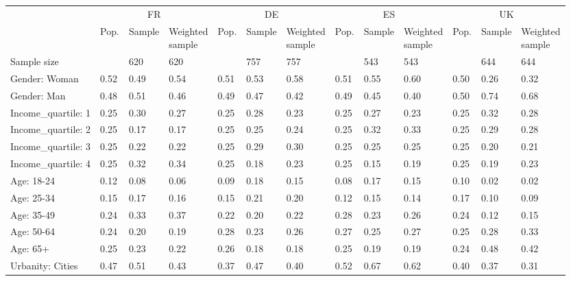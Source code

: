 
\begin{tabular}[t]{lllllllllllll}
\toprule
\multicolumn{1}{c}{} & \multicolumn{3}{c}{FR} & \multicolumn{3}{c}{DE} & \multicolumn{3}{c}{ES} & \multicolumn{3}{c}{UK} \\
\cmidrule(l{3pt}r{3pt}){2-4} \cmidrule(l{3pt}r{3pt}){5-7} \cmidrule(l{3pt}r{3pt}){8-10} \cmidrule(l{3pt}r{3pt}){11-13}
  & Pop. & Sample & \makecell{Weighted\\sample} & Pop. & Sample & \makecell{Weighted\\sample} & Pop. & Sample & \makecell{Weighted\\sample} & Pop. & Sample & \makecell{Weighted\\sample}\\
\midrule
Sample size &  & 620 & 620 &  & 757 & 757 &  & 543 & 543 &  & 644 & 644\\
\addlinespace
Gender: Woman & 0.52 & 0.49 & 0.54 & 0.51 & 0.53 & 0.58 & 0.51 & 0.55 & 0.60 & 0.50 & 0.26 & 0.32\\
Gender: Man & 0.48 & 0.51 & 0.46 & 0.49 & 0.47 & 0.42 & 0.49 & 0.45 & 0.40 & 0.50 & 0.74 & 0.68\\
\addlinespace
Income\_quartile: 1 & 0.25 & 0.30 & 0.27 & 0.25 & 0.28 & 0.23 & 0.25 & 0.27 & 0.23 & 0.25 & 0.32 & 0.28\\
Income\_quartile: 2 & 0.25 & 0.17 & 0.17 & 0.25 & 0.25 & 0.24 & 0.25 & 0.32 & 0.33 & 0.25 & 0.29 & 0.28\\
Income\_quartile: 3 & 0.25 & 0.22 & 0.22 & 0.25 & 0.29 & 0.30 & 0.25 & 0.25 & 0.25 & 0.25 & 0.20 & 0.21\\
Income\_quartile: 4 & 0.25 & 0.32 & 0.34 & 0.25 & 0.18 & 0.23 & 0.25 & 0.15 & 0.19 & 0.25 & 0.19 & 0.23\\
\addlinespace
Age: 18-24 & 0.12 & 0.08 & 0.06 & 0.09 & 0.18 & 0.15 & 0.08 & 0.17 & 0.15 & 0.10 & 0.02 & 0.02\\
Age: 25-34 & 0.15 & 0.17 & 0.16 & 0.15 & 0.21 & 0.20 & 0.12 & 0.15 & 0.14 & 0.17 & 0.10 & 0.09\\
Age: 35-49 & 0.24 & 0.33 & 0.37 & 0.22 & 0.20 & 0.22 & 0.28 & 0.23 & 0.26 & 0.24 & 0.12 & 0.15\\
Age: 50-64 & 0.24 & 0.20 & 0.19 & 0.28 & 0.23 & 0.26 & 0.27 & 0.25 & 0.27 & 0.25 & 0.28 & 0.33\\
Age: 65+ & 0.25 & 0.23 & 0.22 & 0.26 & 0.18 & 0.18 & 0.25 & 0.19 & 0.19 & 0.24 & 0.48 & 0.42\\
\addlinespace
Urbanity: Cities & 0.47 & 0.51 & 0.43 & 0.37 & 0.47 & 0.40 & 0.52 & 0.67 & 0.62 & 0.40 & 0.37 & 0.31\\

\end{tabular}
